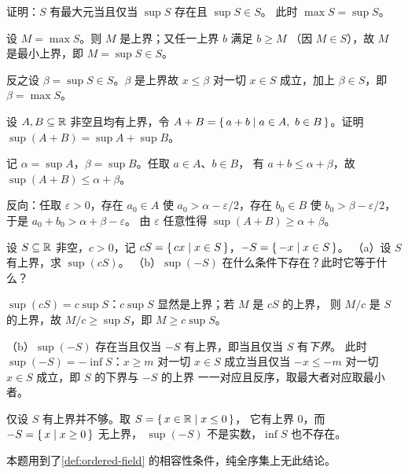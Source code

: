\begin{exercise}[例行]
  \label{exr:max-sup}
  证明：\(S\) 有最大元当且仅当 \(\sup S\) 存在且 \(\sup S \in S\)。
  此时 \(\max S = \sup S\)。
  \begin{solution}
    设 \(M = \max S\)。则 \(M\) 是上界；又任一上界 \(b\) 满足 \(b \ge M\)
    （因 \(M \in S\)），故 \(M\) 是最小上界，即 \(M = \sup S \in S\)。

    反之设 \(\beta = \sup S \in S\)。\(\beta\) 是上界故 \(x \le \beta\)
    对一切 \(x \in S\) 成立，加上 \(\beta \in S\)，即 \(\beta = \max S\)。
  \end{solution}
\end{exercise}

\begin{exercise}[例行]
  \label{exr:sup-sum}
  设 \(A, B \subseteq \mathbb{R}\) 非空且均有上界，令
  \(A + B = \left\{\,a + b \;\middle|\; a \in A,\ b \in B\,\right\}\)。证明 \(\sup(A + B) = \sup A + \sup B\)。
  \begin{solution}
    记 \(\alpha = \sup A\)，\(\beta = \sup B\)。任取 \(a \in A\)、\(b \in B\)，
    有 \(a + b \le \alpha + \beta\)，故 \(\sup(A+B) \le \alpha + \beta\)。

    反向：任取 \(\varepsilon > 0\)，存在 \(a_{0} \in A\) 使
    \(a_{0} > \alpha - \varepsilon/2\)，存在 \(b_{0} \in B\) 使
    \(b_{0} > \beta - \varepsilon/2\)，于是
    \(a_{0} + b_{0} > \alpha + \beta - \varepsilon\)。
    由 \(\varepsilon\) 任意性得 \(\sup(A+B) \ge \alpha + \beta\)。
  \end{solution}
\end{exercise}

\begin{exercise}[例行]
  \label{exr:sup-scalar}
  设 \(S \subseteq \mathbb{R}\) 非空，\(c > 0\)，记
  \(cS = \left\{\,cx \;\middle|\; x \in S\,\right\}\)，\(-S = \left\{\,-x \;\middle|\; x \in S\,\right\}\)。
  （a）设 \(S\) 有上界，求 \(\sup(cS)\)。
  （b）\(\sup(-S)\) 在什么条件下存在？此时它等于什么？
  \begin{solution}
    \(\sup(cS) = c\sup S\)：\(c\sup S\) 显然是上界；若 \(M\) 是 \(cS\) 的上界，
    则 \(M/c\) 是 \(S\) 的上界，故 \(M/c \ge \sup S\)，即 \(M \ge c\sup S\)。

    （b）\(\sup(-S)\) 存在当且仅当 \(-S\) 有上界，即当且仅当 \(S\) 有\emph{下界}。
    此时 \(\sup(-S) = -\inf S\)：\(x \ge m\) 对一切 \(x \in S\) 成立当且仅当
    \(-x \le -m\) 对一切 \(x \in S\) 成立，即 \(S\) 的下界与 \(-S\) 的上界
    一一对应且反序，取最大者对应取最小者。

    仅设 \(S\) 有上界并不够。取 \(S = \left\{\,x \in \mathbb{R} \;\middle|\; x \le 0\,\right\}\)，
    它有上界 \(0\)，而 \(-S = \left\{\,x \;\middle|\; x \ge 0\,\right\}\) 无上界，
    \(\sup(-S)\) 不是实数，\(\inf S\) 也不存在。

    本题用到了\cref{def:ordered-field} 的相容性条件，纯全序集上无此结论。
  \end{solution}
\end{exercise}

